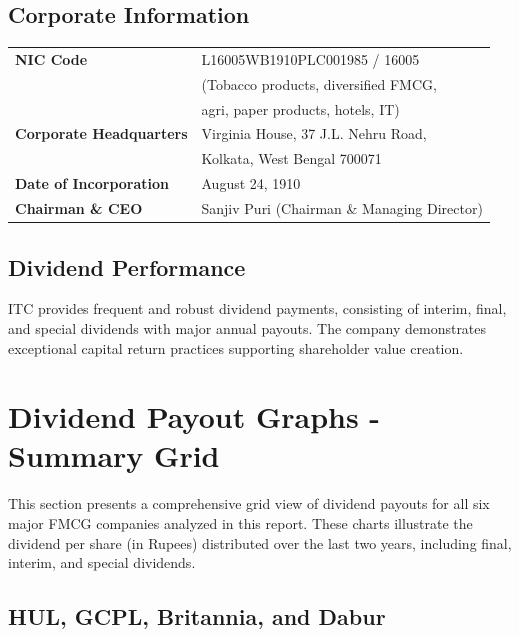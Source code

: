 \documentclass[12pt, a4paper]{report}
\begin{document}
\subsection{Corporate Information}

\begin{tabular}{ll}
    \textbf{NIC Code} & L16005WB1910PLC001985 / 16005 \\
                      & (Tobacco products, diversified FMCG, \\
                      & agri, paper products, hotels, IT) \\
    \textbf{Corporate Headquarters} & Virginia House, 37 J.L. Nehru Road, \\
                                    & Kolkata, West Bengal 700071 \\
    \textbf{Date of Incorporation} & August 24, 1910 \\
    \textbf{Chairman \& CEO} & Sanjiv Puri (Chairman \& Managing Director) \\
\end{tabular}

\subsection{Dividend Performance}

ITC provides frequent and robust dividend payments, consisting of interim, final, and special dividends with major annual payouts. The company demonstrates exceptional capital return practices supporting shareholder value creation.

\vspace{1cm}

\newpage

\section*{Dividend Payout Graphs - Summary Grid}

This section presents a comprehensive grid view of dividend payouts for all six major FMCG companies analyzed in this report. These charts illustrate the dividend per share (in Rupees) distributed over the last two years, including final, interim, and special dividends.


\subsection*{HUL, GCPL, Britannia, and Dabur}
\end{document}
